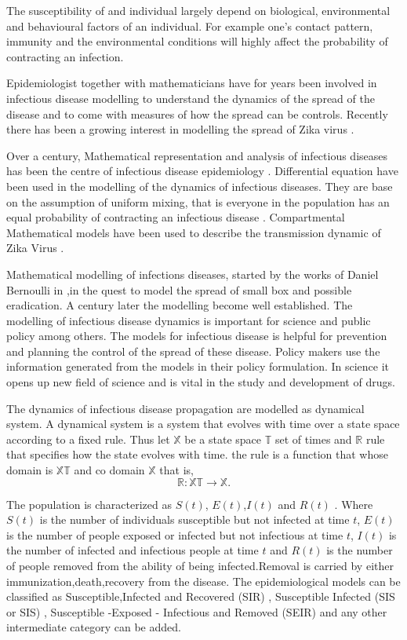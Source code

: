 The susceptibility of and individual largely depend on biological, environmental and behavioural factors of an individual. For example one's contact pattern, immunity and the environmental conditions will highly affect the probability of contracting an infection.

Epidemiologist together with mathematicians have for years been involved in infectious disease modelling to understand the dynamics of the spread of the disease and to come with measures of how the spread can be controls. Recently there has been a growing interest in modelling the spread of Zika virus \citep{ku2016}.

Over a  century, Mathematical representation and analysis of infectious diseases has been the centre of  infectious disease epidemiology \citep{b2005}. Differential equation have been used in the modelling of the dynamics of infectious diseases. They are base on the assumption of uniform mixing, that is everyone in the population has an equal probability of contracting an infectious disease \citep{kaplan2002emergency}.
Compartmental Mathematical models have been used to describe the transmission dynamic of Zika Virus \citep{gao2016}.

Mathematical modelling of infections diseases, started by the works of Daniel Bernoulli in \cite{bernoulli1760essai},in the quest to model the spread of small box and possible eradication. A century later the modelling become well established. The modelling of infectious disease dynamics is important for science and public policy among others. The models for infectious disease is helpful for prevention and planning the control of the spread of these disease. Policy makers use the information generated from the models in their policy formulation. In science it opens up new field of science and is vital in the study and development of drugs.

The dynamics of infectious disease propagation are modelled as dynamical system. A dynamical system is a system that evolves with time over a state space according to a fixed rule. Thus let $\mathbb{X}$ be a state space $\mathbb{T}$ set of times and $\mathbb{R}$ rule that specifies how the state evolves with time. the rule is a function that whose domain is $\mathbb{X} \mathbb{T}$ and co domain $\mathbb{X}$ that is,
\begin{equation*}
\mathbb{R}: \mathbb{X} \mathbb{T} \longrightarrow \mathbb{X}.
\end{equation*}

The population is characterized as $S(t)$, $E(t)$,$I(t)$ and $R(t)$ . Where $S(t)$ is the number of individuals susceptible but not infected at time $t$, $E(t)$ is the number of people exposed or infected but not infectious at time $t$, $I(t)$ is the number of infected and infectious people at time $t$ and $R(t)$ is the number of people removed from the ability of being infected.Removal is carried by either immunization,death,recovery from the disease. The epidemiological models can be classified as Susceptible,Infected and Recovered (SIR) , Susceptible Infected (SIS or SIS) , Susceptible -Exposed - Infectious and Removed (SEIR)  and any other intermediate category can be added.

